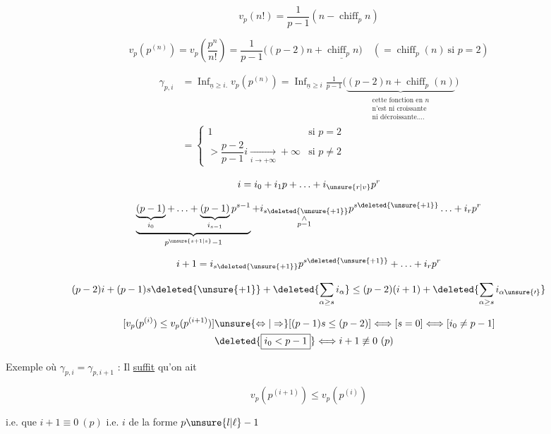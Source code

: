 
\[
 v_p(n!)=\frac{1}{p-1}(n-\operatorname{chiff}_p n)
\]

\[
 v_p(p^{(n)})=v_p\left(\frac{p^n}{n!}\right)=\frac{1}{p-1}\bigl((p-2)n+\underline{\operatorname{chiff}_p n}\bigr)
 \quad(=\operatorname{chiff}_p(n)\ \text{si }p=2)
\]


\[
\begin{aligned}
 \gamma_{p,i}&=\mathop{\mathrm{Inf}}_{\underline n\geq i.}v_p(p^{(n)})
 =\mathop{\mathrm{Inf}}_{\underline n\geq i}\frac1{p-1}\bigl(\underbrace{(p-2)n+\operatorname{chiff}_p(n)}_{\substack{\text{cette fonction en }n\\\text{n'est ni croissante}\\\text{ni décroissante\ldots.}}}\bigr)\\
 &=\begin{cases}1&\text{si }p=2\\
 >\dfrac{p-2}{p-1}i\xrightarrow[i\to+\infty]{}+\infty&\text{si }p\ne2\end{cases}
\end{aligned}
\]

\[
 i=i_0+i_1p+\ldots+i_{\unsure{r|v}}p^r
\]

  

\[
 \underbrace{\underbrace{(p-1)}_{i_0}+\ldots+\underbrace{(p-1)}_{i_{s-1}}p^{s-1}}_{p^{\unsure{s+1|s}}-1}
 +\underset{\substack{\wedge\\p-1}}{i_{s\deleted{\unsure{+1}}}}p^{s\deleted{\unsure{+1}}}\ldots+i_r p^r
\]

\[
 i+1=i_{s\deleted{\unsure{+1}}}p^{s\deleted{\unsure{+1}}}+\ldots+i_rp^r
\]

\[
 (p-2)i+(p-1)s\deleted{\unsure{+1}}+\deleted{\sum_{\alpha\geq s}i_\alpha}
 \leq(p-2)(i+1)+\deleted{\sum_{\alpha\geq s}i_{\alpha\unsure{\prime}}}
\]

\[
\begin{aligned}
 [v_p(p^{(i)})\leq v_p(p^{(i+1)})]&\unsure{\Leftrightarrow|\Rightarrow}
 [(p-1)s\leq(p-2)]\Longleftrightarrow[s=0]\Longleftrightarrow[i_0\ne p-1]\\
 &\deleted{\boxed{i_0<p-1}}\Longleftrightarrow i+1\not\equiv0\ (p)
\end{aligned}
\]

Exemple où $\gamma_{p,i}=\gamma_{p,i+1}$ : Il \uline{suffit} qu'on ait 

\[
 v_p(p^{(i+1)})\leq v_p(p^{(i)})
\]

i.e. que \quad{} $i+1\equiv0\ (p)$ i.e. $i$ de la forme $p\unsure{l|\ell}-1$

